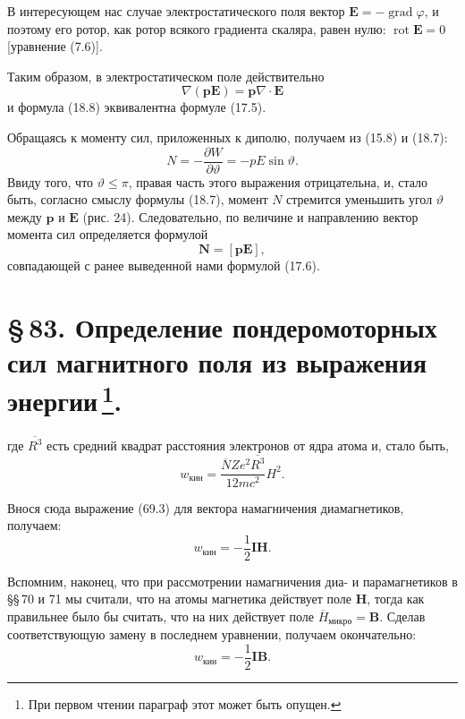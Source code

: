 \documentclass[a4paper,12pt]{article}
\begin{document}
В интересующем нас случае электростатического поля вектор
$\mathbf{E} = -\operatorname{grad}\varphi$, и поэтому его ротор, как
ротор всякого градиента скаляра, равен нулю:
$\operatorname{rot}\mathbf{E} = 0$ [уравнение (7.6)].

Таким образом, в электростатическом поле действительно
\begin{equation}
    \nabla(\mathbf{p}\mathbf{E}) = \mathbf{p}\nabla\cdot\mathbf{E}
    \tag{18.10}
\end{equation}
и формула (18.8) эквивалентна формуле (17.5).

Обращаясь к моменту сил, приложенных к диполю, получаем из (15.8)
и (18.7):
$$
    N = -\frac{\partial W}{\partial\vartheta} = -pE\sin\vartheta.
$$
Ввиду того, что $\vartheta \leqslant \pi$, правая часть этого выражения
отрицательна, и, стало быть, согласно смыслу формулы (18.7), момент
$N$ стремится уменьшить угол $\vartheta$ между $\mathbf{p}$ и $\mathbf{E}$
(рис. 24). Следовательно, по величине и направлению вектор момента
сил определяется формулой
\begin{equation}
    \mathbf{N} = [\mathbf{p}\mathbf{E}],
    \tag{18.11}
\end{equation}
совпадающей с ранее выведенной нами формулой (17.6).


\section*{\S\,83. Определение пондеромоторных сил магнитного поля
из выражения энергии\,\footnote{При первом чтении параграф этот может
быть опущен.}.}


где $\overline{R^3}$ есть средний квадрат расстояния электронов от
ядра атома и, стало быть,
$$
    w_{\text{кин}} = \frac{\overline{N}Ze^2\overline{R^3}}{12mc^2}H^2.
$$

Внося сюда выражение (69.3) для вектора намагничения диамагнетиков,
получаем:
$$
    w_{\text{кин}} = -\frac{1}{2}\mathbf{I}\mathbf{H}.
$$

Вспомним, наконец, что при рассмотрении намагничения диа- и
парамагнетиков в §§\,70 и 71 мы считали, что на атомы магнетика
действует поле $\mathbf{H}$, тогда как правильнее было бы считать,
что на них действует поле $\overline{H}_{\text{микро}} = \mathbf{B}$.
Сделав соответствующую замену в последнем уравнении, получаем
окончательно:
\begin{equation}
    w_{\text{кин}} = -\frac{1}{2}\mathbf{I}\mathbf{B}.
    \tag{82.3}
\end{equation}
\end{document}
